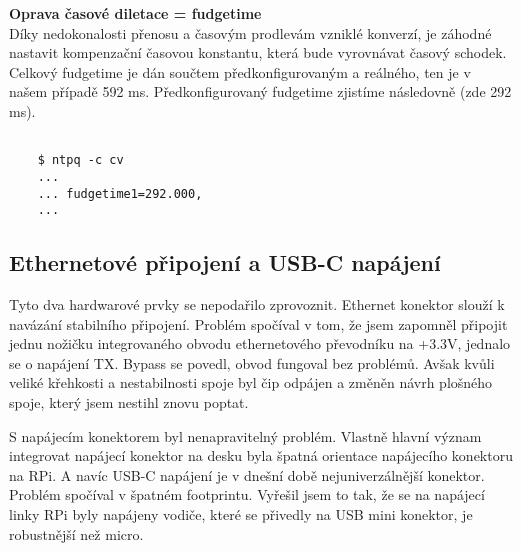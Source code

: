     \textbf{Oprava časové diletace = fudgetime}
    \\

    Díky nedokonalosti přenosu a časovým prodlevám vzniklé konverzí, je záhodné nastavit
    kompenzační časovou konstantu, která bude vyrovnávat časový schodek. Celkový fudgetime
    je dán součtem předkonfigurovaným a reálného, ten je v našem případě 592 ms.
    Předkonfigurovaný fudgetime zjistíme následovně (zde 292 ms).

   \begin{lstlisting}

    $ ntpq -c cv
    ...
    ... fudgetime1=292.000,
    ...
   \end{lstlisting}

\subsection{Ethernetové připojení a USB-C napájení}

Tyto dva hardwarové prvky se nepodařilo zprovoznit. Ethernet konektor slouží k navázání
stabilního připojení. Problém spočíval v tom, že jsem zapomněl připojit jednu nožičku
integrovaného obvodu ethernetového převodníku na +3.3V, jednalo se o napájení TX. Bypass
se povedl, obvod fungoval bez problémů. Avšak kvůli veliké křehkosti a nestabilnosti spoje
byl čip odpájen a změněn návrh plošného spoje, který jsem nestihl znovu poptat.

S napájecím konektorem byl nenapravitelný problém. Vlastně hlavní význam integrovat
napájecí konektor na desku byla špatná orientace napájecího konektoru na RPi. A navíc
USB-C napájení je v dnešní době nejuniverzálnější konektor. Problém spočíval v špatném
footprintu. Vyřešil jsem to tak, že se na napájecí linky RPi byly napájeny vodiče, které se
přivedly na USB mini konektor, je robustnější než micro.
